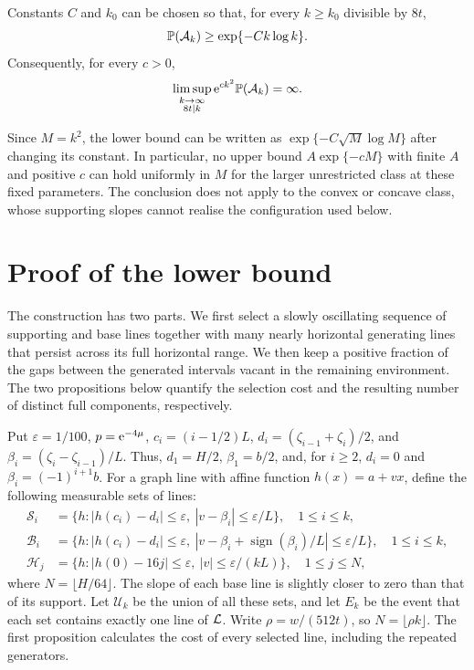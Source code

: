 \documentclass[11pt,letterpaper]{article}
\begin{document}
\begin{theorem}\label{thm:lower}
Constants $C$ and $k_0$ can be chosen so that, for every $k\ge k_0$ divisible by $8t$,
\begin{equation}\label{eq:lower}
 \P(\mathcal A_k)\ge\exp\{-Ck\log k\}.
\end{equation}
Consequently, for every $c>0$,
\[
 \limsup_{\substack{k\to\infty\\8t\mid k}}
             \e^{ck^2}\P(\mathcal A_k)=\infty.
\]
\end{theorem}

Since $M=k^2$, the lower bound can be written as $\exp\{-C\sqrt M\log M\}$ after changing its constant. In particular, no upper bound $A\exp\{-cM\}$ with finite $A$ and positive $c$ can hold uniformly in $M$ for the larger unrestricted class at these fixed parameters. The conclusion does not apply to the convex or concave class, whose supporting slopes cannot realise the configuration used below.

\section{Proof of the lower bound}

The construction has two parts. We first select a slowly oscillating sequence of supporting and base lines together with many nearly horizontal generating lines that persist across its full horizontal range. We then keep a positive fraction of the gaps between the generated intervals vacant in the remaining environment. The two propositions below quantify the selection cost and the resulting number of distinct full components, respectively.

Put $\varepsilon=1/100$, $p=\e^{-4\mu}$, $c_i=(i-1/2)L$, $d_i=(\zeta_{i-1}+\zeta_i)/2$, and $\beta_i=(\zeta_i-\zeta_{i-1})/L$. Thus, $d_1=H/2$, $\beta_1=b/2$, and, for $i\ge2$, $d_i=0$ and $\beta_i=(-1)^{i+1}b$. For a graph line with affine function $h(x)=a+vx$, define the following measurable sets of lines:
\begin{equation}\label{eq:cells}
\begin{aligned}
 \mathscr S_i&=\{h:|h(c_i)-d_i|\le\varepsilon,
                       \ |v-\beta_i|\le\varepsilon/L\},\quad 1\le i\le k,\\
 \mathscr B_i&=\{h:|h(c_i)-d_i|\le\varepsilon,
               \ |v-\beta_i+\operatorname{sign}(\beta_i)/L|\le\varepsilon/L\},
                      \quad 1\le i\le k,\\
 \mathscr H_j&=\{h:|h(0)-16j|\le\varepsilon,
                       \ |v|\le\varepsilon/(kL)\},\quad 1\le j\le N,
\end{aligned}
\end{equation}
where $N=\lfloor H/64\rfloor$. The slope of each base line is slightly closer to zero than that of its support. Let $\mathscr U_k$ be the union of all these sets, and let $E_k$ be the event that each set contains exactly one line of $\cL$. Write $\rho=w/(512t)$, so $N=\lfloor\rho k\rfloor$. The first proposition calculates the cost of every selected line, including the repeated generators.
\end{document}
